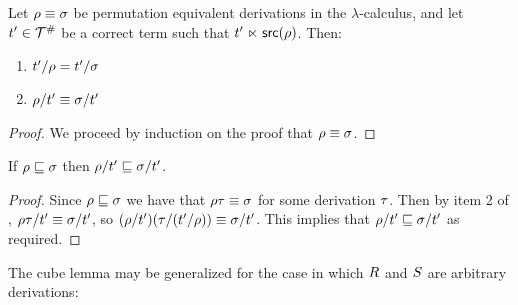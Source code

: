 \begin{proposition}
Let $\rho \equiv \sigma$ be permutation equivalent derivations in the $\lambda$-calculus,
and let $t' \in \mathcal{T}^{\mathtt{\#}}$ be a correct term such that $t' \mathrel{\ltimes} \mathsf{src}(\rho)$.
Then:
\begin{enumerate}
\item $t'/\rho = t'/\sigma$
\item $\rho/t' \equiv \sigma/t'$
\end{enumerate}
\end{proposition}
\begin{proof}
We proceed by induction on the proof that $\rho \equiv \sigma$.
\end{proof}

\begin{corollary}
If $\rho \sqsubseteq \sigma$
then $\rho/t' \sqsubseteq \sigma/t'$.
\end{corollary}
\begin{proof}
Since $\rho \sqsubseteq \sigma$ we have that $\rho\tau \equiv \sigma$
for some derivation $\tau$.
Then by item 2 of ,
$\rho\tau/t' \equiv \sigma/t'$,
so $(\rho/t')(\tau/(t'/\rho)) \equiv \sigma/t'$.
This implies that $\rho/t' \sqsubseteq \sigma/t'$ as required.
\end{proof}

The cube lemma may be generalized for the case in which $R$ and $S$ are arbitrary derivations:

